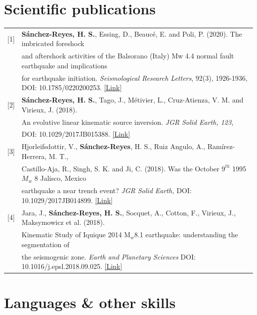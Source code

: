 \documentclass[a4paper]{article} %
\begin{document}
\section{Scientific publications}
\begin{tabular}{ll}
 [1] & {\bf S\'anchez-Reyes, H. S.}, Essing, D., Beauc\'e, E. and Poli, P. (2020). The imbricated foreshock  \tabularnewline
     & and aftershock activities of the Balsorano (Italy) Mw 4.4 normal fault earthquake and implications \\
     & for earthquake initiation. {\it Seismological Research Letters}, 92(3), 1926-1936,  DOI: 10.1785/0220200253. \href{https://github.com/hugosanrocks/hugosanrocks.github.com/blob/master/tex_documents/drafts/2020_SRL/2019_Balsorano_final_draft.pdf}{[Link]} \\[0.6em]
     
     
 [2] & {\bf S\'anchez-Reyes, H. S.}, Tago, J., Métivier, L., Cruz-Atienza, V. M. and Virieux, J. (2018). \tabularnewline 
     & An evolutive linear kinematic source inversion. {\it JGR Solid Earth, 123}, \\
     & DOI: 10.1029/2017JB015388. \href{https://agupubs.onlinelibrary.wiley.com/doi/10.1029/2017JB015388}{[Link]} \\[0.6em]

 [3] & Hjorleifsdottir, V., {\bf S\'anchez-Reyes}, H. S., Ruiz Angulo, A., Ramírez-Herrera, M. T., \tabularnewline
     & Castillo-Aja, R., Singh, S. K. and Ji, C. (2018). Was the October $9^{th}$ 1995 $M_w$ 8 Jalisco, Mexico \\
     & earthquake a near trench event? {\it JGR Solid Earth,} DOI: 10.1029/2017JB014899. \href{https://agupubs.onlinelibrary.wiley.com/doi/10.1029/2017JB014899}{[Link]} \\[0.6em]
     
 [4] & Jara, J., {\bf S\'anchez-Reyes, H. S.}, Socquet, A., Cotton, F., Virieux, J., Maksymowicz et al. (2018). \\
     & Kinematic Study of Iquique 2014 M$_w$8.1 earthquake: understanding the segmentation of \\
     & the seismogenic zone. {\it Earth and Planetary Sciences} DOI: 10.1016/j.epsl.2018.09.025. \href{https://www.sciencedirect.com/science/article/pii/S0012821X18305648}{[Link]} \\[0.6em]
     
\end{tabular}

\vskip 0.2cm
\section{Languages \hspace{0.55cm} \& \hspace{0.55cm} other skills}
\end{document}
